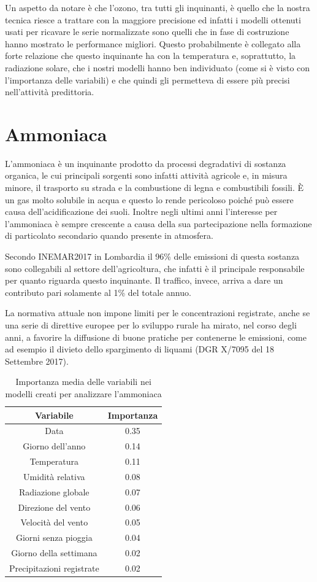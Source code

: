 \documentclass[a4paper]{report}
\begin{document}
Un aspetto da notare è che l'ozono, tra tutti gli inquinanti, è quello che la nostra tecnica riesce a trattare con la maggiore precisione ed infatti i modelli ottenuti usati per ricavare le serie normalizzate sono quelli che in fase di costruzione hanno mostrato le performance migliori. Questo probabilmente è collegato alla forte relazione che questo inquinante ha con la temperatura e, soprattutto, la radiazione solare, che i nostri modelli hanno ben individuato (come si è visto con l'importanza delle variabili) e che quindi gli permetteva di essere più precisi nell'attività predittoria.

\section{Ammoniaca}
L'ammoniaca è un inquinante prodotto da processi degradativi di sostanza organica, le cui principali sorgenti sono infatti attività agricole e, in misura minore, il trasporto su strada e la combustione di legna e combustibili fossili. È un gas molto solubile in acqua e questo lo rende pericoloso poiché può essere causa dell'acidificazione dei suoli. Inoltre negli ultimi anni l'interesse per l'ammoniaca è sempre crescente a causa della sua partecipazione nella formazione di particolato secondario quando presente in atmosfera.

Secondo INEMAR2017 in Lombardia il 96\% delle emissioni di questa sostanza sono collegabili al settore dell'agricoltura, che infatti è il principale responsabile per quanto riguarda questo inquinante. Il traffico, invece, arriva a dare un contributo pari solamente al 1\% del totale annuo.

La normativa attuale non impone limiti per le concentrazioni registrate, anche se una serie di direttive europee per lo sviluppo rurale ha mirato, nel corso degli anni, a favorire la diffusione di buone pratiche per contenerne le emissioni, come ad esempio il divieto dello spargimento di liquami (DGR X/7095 del 18 Settembre 2017). 

\begin{table}[h!]
\centering
\begin{tabular}{ |c c| }
	\hline
	Variabile & Importanza \\
	\hline
	Data & 0.35 \\
	Giorno dell'anno & 0.14 \\
	Temperatura & 0.11 \\
	Umidità relativa & 0.08 \\
	Radiazione globale & 0.07 \\
	Direzione del vento & 0.06 \\
	Velocità del vento & 0.05 \\
	Giorni senza pioggia & 0.04 \\
	Giorno della settimana & 0.02 \\
	Precipitazioni registrate & 0.02 \\
	\hline
\end{tabular}
\caption{Importanza media delle variabili nei modelli creati per analizzare l'ammoniaca}
\label{table:importanza_ammoniaca}
\end{table}
\end{document}
